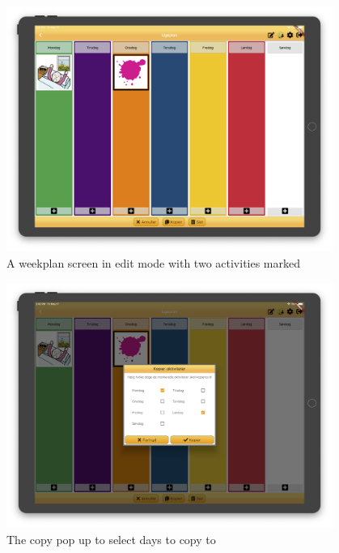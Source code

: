\begin{figure}[H]
    \begin{center}
        \includegraphics[width=0.95\textwidth]{figures/FinalScreen/editWeekplanScreenMarked.png}
    \end{center}
    \caption{A weekplan screen in edit mode with two activities marked}
    \label{fig:finalWeekplanEditMode}
\end{figure}
\begin{figure}[H]
    \begin{center}
        \includegraphics[width=0.95\textwidth]{figures/FinalScreen/editWeekplanScreenCopy.png}
    \end{center}
    \caption{The copy pop up to select days to copy to}
    \label{fig:finalWeekplanScreenCopy}
\end{figure}
